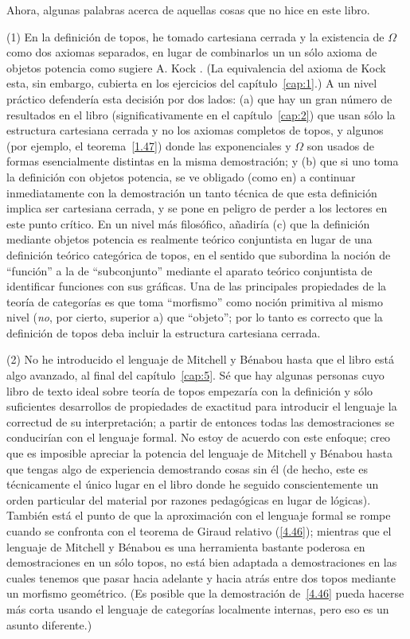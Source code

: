 Ahora, algunas palabras acerca de aquellas cosas que no hice en este libro.

(1) En la definición de topos, he tomado cartesiana cerrada y la existencia de
\(\Omega\) como dos axiomas separados, en lugar de combinarlos un un sólo axioma
de objetos potencia como sugiere A. Kock \pend{[66]}. (La equivalencia del
axioma de Kock esta, sin embargo, cubierta en los ejercicios del
capítulo~\ref{cap:1}.) A un nivel práctico defendería esta decisión por dos
lados: (a) que hay un gran número de resultados en el libro (significativamente
en el capítulo~\ref{cap:2}) que usan sólo la estructura cartesiana cerrada y no
los axiomas completos de topos, y algunos (por ejemplo, el teorema~\ref{1.47})
donde las exponenciales y \(\Omega\) son usados de formas esencialmente
distintas en la misma demostración; y (b) que si uno toma la definición con
objetos potencia, se ve obligado (como en\pend{[WB]}) a continuar inmediatamente
con la demostración un tanto técnica de que esta definición implica ser
cartesiana cerrada, y se pone en peligro de perder a los lectores en este punto
crítico. En un nivel más filosófico, añadiría (c) que la definición mediante
objetos potencia es realmente teórico conjuntista en lugar de una definición
teórico categórica de topos, en el sentido que subordina la noción de
\enquote{función} a la de \enquote{subconjunto} mediante el aparato teórico
conjuntista de identificar funciones con sus gráficas. Una de las principales
propiedades de la teoría de categorías es que toma \enquote{morfismo} como
noción primitiva al mismo nivel (\emph{no}, por cierto, superior a) que
\enquote{objeto}; por lo tanto es correcto que la definición de topos deba
incluir la estructura cartesiana cerrada.

(2) No he introducido el lenguaje de Mitchell y Bénabou hasta que el libro está
algo avanzado, al final del capítulo~\ref{cap:5}. Sé que hay algunas personas
cuyo libro de texto ideal sobre teoría de topos empezaría con la definición y
sólo suficientes desarrollos de propiedades de exactitud para introducir el
lenguaje la correctud de su interpretación; a partir de entonces todas las
demostraciones se conducirían con el lenguaje formal. No estoy de acuerdo con
este enfoque; creo que es imposible apreciar la potencia del lenguaje de
Mitchell y Bénabou hasta que tengas algo de experiencia demostrando cosas sin él
(de hecho, este es técnicamente el único lugar en el libro donde he seguido
conscientemente un orden particular del material por razones pedagógicas en
lugar de lógicas). También está el punto de que la aproximación con el lenguaje
formal se rompe cuando se confronta con el teorema de Giraud relativo
(\ref{4.46}); mientras que el lenguaje de Mitchell y Bénabou es una herramienta
bastante poderosa en demostraciones en un sólo topos, no está bien adaptada a
demostraciones en las cuales tenemos que pasar hacia adelante y hacia atrás
entre dos topos mediante un morfismo geométrico. (Es posible que la demostración
de~\ref{4.46} pueda hacerse más corta usando el lenguaje de categorías localmente
internas, pero eso es un asunto diferente.)

